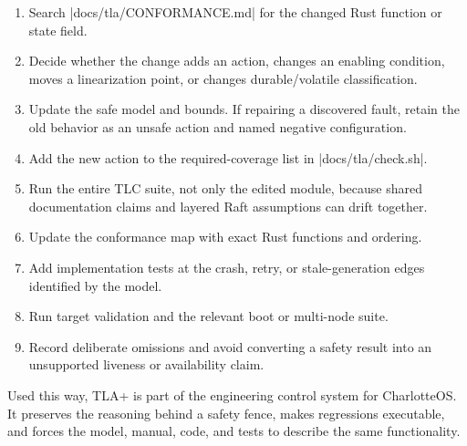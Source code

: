 \begin{enumerate}
    \item Search \repofile|docs/tla/CONFORMANCE.md| for the changed Rust
        function or state field.
    \item Decide whether the change adds an action, changes an enabling
        condition, moves a linearization point, or changes durable/volatile
        classification.
    \item Update the safe model and bounds. If repairing a discovered fault,
        retain the old behavior as an unsafe action and named negative
        configuration.
    \item Add the new action to the required-coverage list in
        \repofile|docs/tla/check.sh|.
    \item Run the entire TLC suite, not only the edited module, because shared
        documentation claims and layered Raft assumptions can drift together.
    \item Update the conformance map with exact Rust functions and ordering.
    \item Add implementation tests at the crash, retry, or stale-generation
        edges identified by the model.
    \item Run target validation and the relevant boot or multi-node suite.
    \item Record deliberate omissions and avoid converting a safety result into
        an unsupported liveness or availability claim.
\end{enumerate}

Used this way, TLA+ is part of the engineering control system for CharlotteOS.
It preserves the reasoning behind a safety fence, makes regressions executable,
and forces the model, manual, code, and tests to describe the same
functionality.

\endinput
